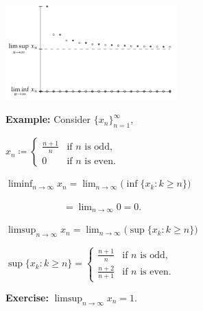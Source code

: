 \documentclass[10pt,aspectratio=169]{beamer}
\begin{document}
\begin{frame}

\hspace*{2.3in}\includegraphics[width=2.6in]{../figures/sequence-limsupliminf_an_bn-example}

\vspace*{-1.5in}

\textbf{Example:}
Consider $\{ x_n \}_{n=1}^\infty$,

\medskip

$\displaystyle
x_n \coloneqq
\begin{cases}
\frac{n+1}{n} & \text{if } n \text{ is odd,} \\
0             & \text{if } n \text{ is even.}
\end{cases}
$

\pause
\medskip

$\displaystyle
\liminf_{n\to\infty} x_n =
\lim_{n\to\infty}
\bigl(
\inf \{ x_k : k \geq n \}
\bigr)
$

\pause
\medskip

$\displaystyle
\qquad
\qquad
\qquad
=
\lim_{n\to\infty} 0 = 0$.

\pause
\medskip

$\displaystyle
\limsup_{n\to\infty} x_n =
\lim_{n\to\infty}
\bigl(
\sup \{ x_k : k \geq n \}
\bigr)$


\pause
\medskip

$\displaystyle
\sup \{ x_k : k \geq n \} =
\begin{cases}
\frac{n+1}{n}   & \text{if } n \text{ is odd,} \\
\frac{n+2}{n+1} & \text{if } n \text{ is even.}
\end{cases}$

\pause
\medskip

\textbf{Exercise:} $\displaystyle \limsup_{n\to\infty} x_n = 1$.

\end{frame}
\end{document}
